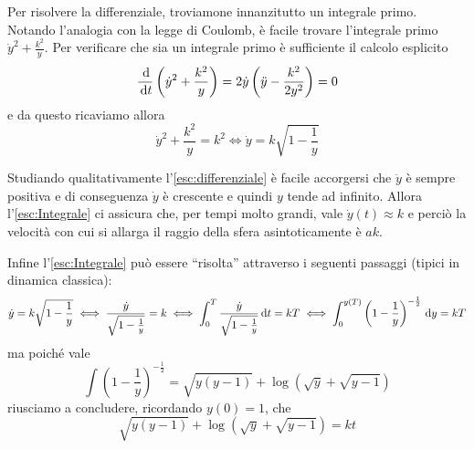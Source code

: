 \documentclass[../main.tex]{subfiles}
\begin{document}
Per risolvere la differenziale, troviamone innanzitutto un integrale primo. 
Notando l'analogia con la legge di Coulomb, è facile trovare l'integrale primo $\dot y^2+\frac{k^2}y$. Per verificare che sia un integrale primo è sufficiente il calcolo esplicito
\begin{equation*}
 	\frac{\,\mathrm d}{\,\mathrm d t}\left(\dot y^2+\frac{k^2}y\right)=2\dot y\left(\ddot y-\frac{k^2}{2y^2}\right)=0
\end{equation*}
e da questo ricaviamo allora
\begin{equation}\label{esc:Integrale}
	\dot y^2+\frac{k^2}y=k^2 \iff \dot y=k\sqrt{1-\frac 1y}
\end{equation}

Studiando qualitativamente l'\cref{esc:differenziale} è facile accorgersi che $\ddot y$ è sempre positiva e di conseguenza $\dot y$ è crescente e quindi $y$ tende ad infinito. 
Allora l'\cref{esc:Integrale} ci assicura che, per tempi molto grandi, vale $\dot y(t)\approx k$ e perciò la velocità con cui si allarga il raggio della sfera asintoticamente è $ak$.

Infine l'\cref{esc:Integrale} può essere ``risolta'' attraverso i seguenti passaggi (tipici in dinamica classica):
\begin{equation*}
	\dot y=k\sqrt{1-\frac 1y} \iff \frac{\dot y}{\sqrt{1-\frac 1y}}=k \iff
	\int_0^T \frac{\dot y}{\sqrt{1-\frac 1y}} \,\mathrm d t=kT \iff \int_0^{y(T)} \left(1-\frac 1y\right)^{-\frac12} \,\mathrm d y=kT
\end{equation*}
ma poiché vale
\begin{equation*}
	\int \left(1-\frac 1y\right)^{-\frac12}=\sqrt{y(y-1)}+\log\left(\sqrt{y}+\sqrt{y-1}\right)
\end{equation*}
riusciamo a concludere, ricordando $y(0)=1$, che
\begin{equation*}
	\sqrt{y(y-1)}+\log\left(\sqrt{y}+\sqrt{y-1}\right)=kt
\end{equation*}
\end{document}

